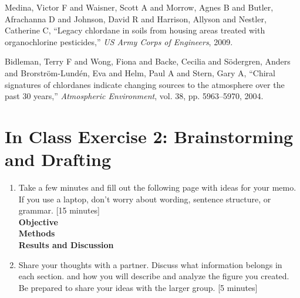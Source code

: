 \documentclass[12pt,letterpaper]{article}
\begin{document}
\begin{thebibliography}{9}



Medina, Victor F and Waisner, Scott A and Morrow, Agnes B and Butler, Afrachanna D and Johnson, David R and Harrison, Allyson and Nestler, Catherine C,
``Legacy chlordane in soils from housing areas treated with organochlorine pesticides,''
\emph{US Army Corps of Engineers}, 2009.


Bidleman, Terry F and Wong, Fiona and Backe, Cecilia and S{\"o}dergren, Anders and Brorstr{\"o}m-Lund{\'e}n, Eva and Helm, Paul A and Stern, Gary A,
``Chiral signatures of chlordanes indicate changing sources to the atmosphere over the past 30 years,''
\emph{Atmospheric Environment}, vol. 38, pp. 5963--5970, 2004.

 

\end{thebibliography}
\pagebreak
\section *{In Class Exercise 2: Brainstorming and Drafting}
\begin{enumerate}
\item Take a few minutes and fill out the following page with ideas for your memo.  If you use a laptop, don't worry about wording, sentence structure, or grammar. [15 minutes]\\ 

\textbf{Objective}\\

\textbf{Methods}\\

\textbf{Results and Discussion}\\

\item Share your thoughts with a partner.  Discuss what information belongs in each section. and how you will describe and analyze the figure you created.  Be prepared to share your ideas with the larger group. [5 minutes]
\end{enumerate}
\end{document}
